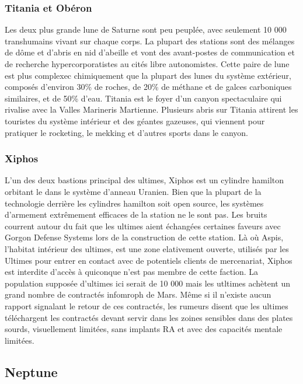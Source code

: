 \subsubsection{Titania et Obéron} \label{sec:titania-oberon} 

Les deux plus grande lune de Saturne sont peu peuplée, avec seulement 10 000 transhumains vivant sur chaque corps. La plupart des stations sont des mélanges de dôme et d'abris en nid d'abeille et vont des avant-postes de communication et de recherche hypercorporatistes au cités libre autonomistes. Cette paire de lune est plus complexec chimiquement que la plupart des lunes du système extérieur, composés d'environ 30\% de roches, de 20\% de méthane et de galces carboniques similaires, et de 50\% d'eau. Titania est le foyer d'un canyon spectaculaire qui rivalise avec la Valles Marineris Martienne. Plusieurs abris sur Titania attirent les touristes du système intérieur et des géantes gazeuses, qui viennent pour pratiquer le rocketing, le mekking et d'autres sports dans le canyon. 

\subsubsection{Xiphos} \label{sec:xiphos} 

L'un des deux bastions principal des ultimes, Xiphos est un cylindre hamilton orbitant le dans le système d'anneau Uranien. Bien que la plupart de la technologie derrière les cylindres hamilton soit open source, les systèmes d'armement extrêmement efficaces de la station ne le sont pas. Les bruits courrent autour du fait que les ultimes aient échangées certaines faveurs avec Gorgon Defense Systems lors de la construction de cette station. Là où Aspis, l'habitat intérieur des ultimes, est une zone elativement ouverte, utilisés par les Ultimes pour entrer en contact avec de potentiels clients de mercenariat, Xiphos est interdite d'accès à quiconque n'est pas membre de cette faction. La population supposée d'ultimes ici serait de 10 000 mais les utltimes achètent un grand nombre de contractés infomroph de Mars. Même si il n'existe aucun rapport signalant le retour de ces contractés, les rumeurs disent que les ultimes téléchargent les contractés devant servir dans les zoines sensibles dans des plates sourds, visuellement limitées, sans implants RA et avec des capacités mentale limitées. 

\subsection{Neptune} \label{sec:neptune} 

